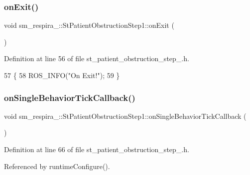 \subsubsection{\texorpdfstring{on\+Exit()}{onExit()}}
{\footnotesize\ttfamily void sm\+\_\+respira\+\_\+::\+St\+Patient\+Obstruction\+Step1\+::on\+Exit (\begin{DoxyParamCaption}{ }\end{DoxyParamCaption})\hspace{0.3cm}{\ttfamily [inline]}}



Definition at line 56 of file st\+\_\+patient\+\_\+obstruction\+\_\+step\+\_.\+h.


\begin{DoxyCode}
57     \{
58         ROS\_INFO(\textcolor{stringliteral}{"On Exit!"});
59     \}
\end{DoxyCode}
\mbox{\label{structsm__respira__1_1_1StPatientObstructionStep1_a87a086647c2ec7b38f86f17d2719c89b}} 
\subsubsection{\texorpdfstring{on\+Single\+Behavior\+Tick\+Callback()}{onSingleBehaviorTickCallback()}}
{\footnotesize\ttfamily void sm\+\_\+respira\+\_\+::\+St\+Patient\+Obstruction\+Step1\+::on\+Single\+Behavior\+Tick\+Callback (\begin{DoxyParamCaption}{ }\end{DoxyParamCaption})\hspace{0.3cm}{\ttfamily [inline]}}



Definition at line 66 of file st\+\_\+patient\+\_\+obstruction\+\_\+step\+\_.\+h.



Referenced by runtime\+Configure().


